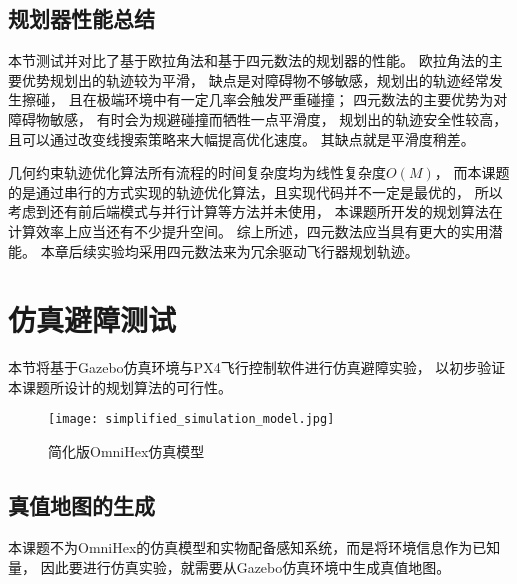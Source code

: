 
\subsection{规划器性能总结}
本节测试并对比了基于欧拉角法和基于四元数法的规划器的性能。
欧拉角法的主要优势规划出的轨迹较为平滑，
缺点是对障碍物不够敏感，规划出的轨迹经常发生擦碰，
且在极端环境中有一定几率会触发严重碰撞；
四元数法的主要优势为对障碍物敏感，
有时会为规避碰撞而牺牲一点平滑度，
规划出的轨迹安全性较高，
且可以通过改变线搜索策略来大幅提高优化速度。
其缺点就是平滑度稍差。

几何约束轨迹优化算法所有流程的时间复杂度均为线性复杂度$O(M)$，
而本课题的是通过串行的方式实现的轨迹优化算法，且实现代码并不一定是最优的，
所以考虑到还有前后端模式与并行计算等方法并未使用，
本课题所开发的规划算法在计算效率上应当还有不少提升空间。
综上所述，四元数法应当具有更大的实用潜能。
本章后续实验均采用四元数法来为冗余驱动飞行器规划轨迹。

\section{仿真避障测试}\label{sec:simulation_experiments}
本节将基于Gazebo仿真环境与PX4飞行控制软件进行仿真避障实验，
以初步验证本课题所设计的规划算法的可行性。
\begin{figure}[!ht]
    \centering
    \texttt{[image: simplified\_simulation\_model.jpg]}
    \caption{简化版OmniHex仿真模型}
    \label{fig:simplified_simulation_model}
\end{figure}
\subsection{真值地图的生成}
本课题不为OmniHex的仿真模型和实物配备感知系统，而是将环境信息作为已知量，
因此要进行仿真实验，就需要从Gazebo仿真环境中生成真值地图。


